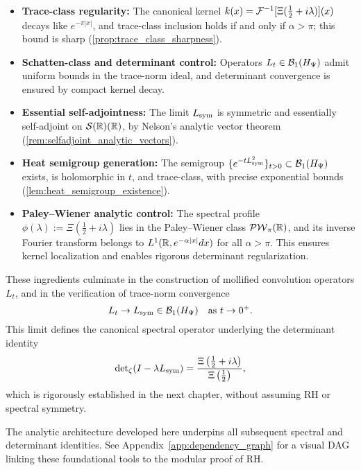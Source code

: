 \begin{itemize}
    \item \textbf{Trace-class regularity:} The canonical kernel \( k(x) = \mathcal{F}^{-1}[\Xi(\tfrac{1}{2} + i\lambda)](x) \) decays like \( e^{-\pi |x|} \), and trace-class inclusion holds if and only if \( \alpha > \pi \); this bound is sharp (\cref{prop:trace_class_sharpness}).

    \item \textbf{Schatten-class and determinant control:} Operators \( L_t \in \mathcal{B}_1(H_{\Psi}) \) admit uniform bounds in the trace-norm ideal, and determinant convergence is ensured by compact kernel decay.

    \item \textbf{Essential self-adjointness:} The limit \( L_{\mathrm{sym}} \) is symmetric and essentially self-adjoint on \( \mathcal{S}(\mathbb{R})(\mathbb{R}) \), by Nelson’s analytic vector theorem (\cref{rem:selfadjoint_analytic_vectors}).

    \item \textbf{Heat semigroup generation:} The semigroup \( \{e^{-t L_{\mathrm{sym}}^2}\}_{t > 0} \subset \mathcal{B}_1(H_{\Psi}) \) exists, is holomorphic in \( t \), and trace-class, with precise exponential bounds (\cref{lem:heat_semigroup_existence}).

    \item \textbf{Paley--Wiener analytic control:} The spectral profile \( \phi(\lambda) := \Xi(\tfrac{1}{2} + i\lambda) \) lies in the Paley--Wiener class \( \mathcal{PW}_{\pi}(\mathbb{R}) \), and its inverse Fourier transform belongs to \( L^1(\mathbb{R}, e^{-\alpha |x|} dx) \) for all \( \alpha > \pi \). This ensures kernel localization and enables rigorous determinant regularization.
\end{itemize}

These ingredients culminate in the construction of mollified convolution operators \( L_t \), and in the verification of trace-norm convergence
\[
L_t \to L_{\mathrm{sym}} \in \mathcal{B}_1(H_{\Psi}) \quad \text{as } t \to 0^+.
\]
This limit defines the canonical spectral operator underlying the determinant identity
\[
\det\nolimits_\zeta(I - \lambda L_{\mathrm{sym}}) = \frac{\Xi\left(\tfrac{1}{2} + i\lambda\right)}{\Xi\left(\tfrac{1}{2}\right)},
\]
which is rigorously established in the next chapter, without assuming RH or spectral symmetry.

\medskip

The analytic architecture developed here underpins all subsequent spectral and determinant identities.
See Appendix~\ref{app:dependency_graph} for a visual DAG linking these foundational tools to the modular proof of RH.
